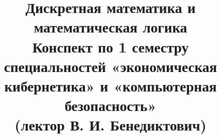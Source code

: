\documentclass[a4paper, 12pt]{report}
\title{\textbf{\Huge{Дискретная математика и математическая логика}}\\Конспект по 1 семестру 
	специальностей «экономическая кибернетика» и «компьютерная безопасность»\\(лектор В. И. Бенедиктович)} %
\date{} %
\newenvironment{example} %
{\par\noindent{\textsc{\textbf{Пример}}}} %
\begin{document}
	\maketitle %
	\tableofcontents{}
\chapter{Высказывания} %
\section*{Высказывания, операции над нами. Формулы логики высказываний (ФЛВ). Равносильные формулы, тавтологии, противоречия. Теорема о подстановке формулы вместо переменной. Теорема о замене подформулы равносильной ей формулой}
\subsection*{Высказывания}
$\bullet$ \textbf{Высказывание} - повествовательное предложение, относительно которого можно сделать вывод, что его содержание истинно или ложно (далее \textbf{И} - истинно, \textbf{Л} - ложно).\\\\
Свойства высказываний:
\begin{enumerate}
	\item \textbf{Закон исключения третьего}\\
	Всякое высказывание является либо истинным, либо ложным.
	\item \textbf{Закон непротиворечивости}\\
	Никакое высказывание не может быть одновременно быть истинным и ложным.
\end{enumerate}

\begin{example}
	\begin{enumerate}
		\item Сейчас дождь (Л);
		\item $2 + 3 = 5$ (И);
		\item $2 + 3 > 5$ (Л);
		\item Закройте дверь (не высказывание);
		\item Идёт ли дождь? (не высказывание);
	\end{enumerate}
\end{example}
Обозначаем высказывания большими латинскими буквами ($A, B,\dotso, Z$).
\end{document}
